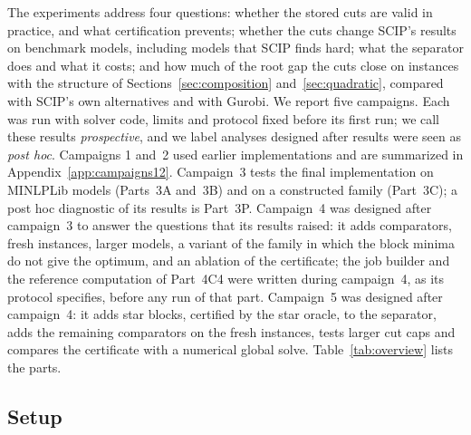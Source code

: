 The experiments address four questions: whether the stored cuts are valid in
practice, and what certification prevents; whether the cuts change SCIP's
results on benchmark models, including models that SCIP finds hard; what the
separator does and what it costs; and how much of the root gap the cuts close
on instances with the structure of Sections~\ref{sec:composition}
and~\ref{sec:quadratic}, compared with SCIP's own alternatives and with Gurobi.
We report five campaigns. Each was run with solver code, limits and protocol
fixed before its first run; we call these results \emph{prospective}, and we
label analyses designed after results were seen as \emph{post hoc}.
Campaigns 1 and~2 used earlier implementations and are summarized in
Appendix~\ref{app:campaigns12}. Campaign~3 tests the final implementation on
MINLPLib models (Parts~3A and~3B) and on a constructed family (Part~3C); a
post hoc diagnostic of its results is Part~3P. Campaign~4 was designed after
campaign~3 to answer the questions that its results raised: it adds
comparators, fresh instances, larger models, a variant of the family in which
the block minima do not give the optimum, and an ablation of the certificate;
the job builder and the reference computation of Part~4C4 were written during
campaign~4, as its protocol specifies, before any run of that part.
Campaign~5 was designed after campaign~4: it adds star blocks, certified by
the star oracle, to the separator, adds the remaining comparators on the fresh
instances, tests larger cut caps and compares the certificate with a numerical
global solve.
Table~\ref{tab:overview} lists the parts.

\subsection{Setup}\label{sec:setup}

